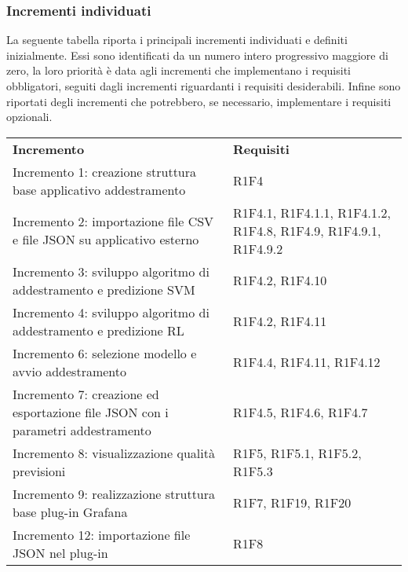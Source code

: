 \subsubsection{Incrementi individuati}
La seguente tabella riporta i principali incrementi individuati e definiti inizialmente. Essi sono identificati da un numero intero progressivo maggiore di zero, la loro priorità è data agli incrementi che implementano i requisiti obbligatori, seguiti dagli incrementi riguardanti i requisiti desiderabili. Infine sono riportati degli incrementi che potrebbero, se necessario, implementare i requisiti opzionali.
\begin{longtable} {
		>{\raggedright\arraybackslash}p{85mm}
		>{\raggedleft\arraybackslash}p{40mm}
	}
	\rowcolor{gray!50} 
	\textbf{Incremento} & 
	\textbf{Requisiti} 	\TBstrut \\
	
	Incremento 1: creazione struttura base applicativo addestramento &
	R1F4  \TBstrut \\ [2mm]		
	
	Incremento 2: importazione file CSV e file JSON su applicativo esterno & 
	R1F4.1, R1F4.1.1, R1F4.1.2, R1F4.8, R1F4.9, R1F4.9.1, R1F4.9.2  \TBstrut \\ [2mm]
	
	Incremento 3: sviluppo algoritmo di addestramento e predizione SVM\glosp & 
	R1F4.2, R1F4.10  \TBstrut \\ [2mm]
	
	Incremento 4: sviluppo algoritmo di addestramento e predizione RL\glosp & 
	R1F4.2, R1F4.11 \TBstrut \\ [2mm]
	
	Incremento 6: selezione modello e avvio addestramento & 
	R1F4.4, R1F4.11, R1F4.12 \TBstrut \\ [2mm]
	
	Incremento 7: creazione ed esportazione file JSON con i parametri addestramento &
	R1F4.5, R1F4.6, R1F4.7 \TBstrut \\ [2mm]
	
	Incremento 8: visualizzazione qualità previsioni &
	R1F5, R1F5.1, R1F5.2, R1F5.3 \TBstrut \\ [2mm]
	
	Incremento 9: realizzazione struttura base plug-in Grafana\glosp &
	R1F7, R1F19, R1F20 \TBstrut \\ [2mm]
	
	Incremento 12: importazione file JSON nel plug-in &
	R1F8 \TBstrut \\ [2mm]
	

\end{longtable}

